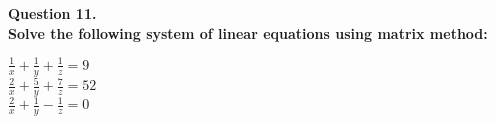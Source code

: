 \documentclass[journal,two column]{IEEEtran}
\author{\LARGE {NIMMALA AVINASH(CS21BTECH11039)}}
\begin{document}
\maketitle
{\LARGE \textbf{Question 11.}}\\

{\Large { \textbf{Solve the following system of linear equations using matrix method:}}}\\

\begin{LARGE}
$\frac{1}{x}+\frac{1}{y}+\frac{1}{z} = 9$\\

$\frac{2}{x}+\frac{5}{y}+\frac{7}{z} = 52$\\

$\frac{2}{x}+\frac{1}{y}-\frac{1}{z} = 0$\\
\end{LARGE}
\end{document}
